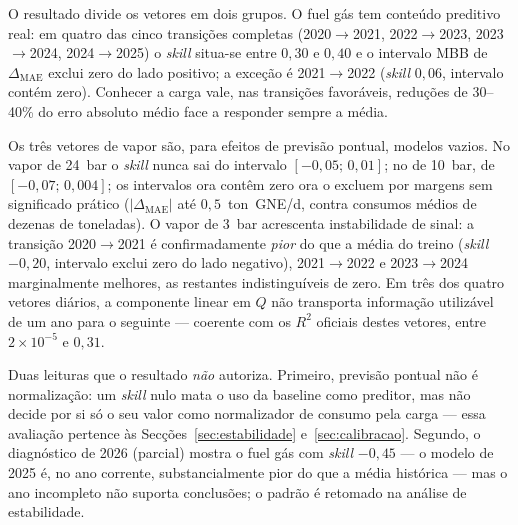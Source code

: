 O resultado divide os vetores em dois grupos. O fuel gás tem conteúdo
preditivo real: em quatro das cinco transições completas
(2020${\to}$2021, 2022${\to}$2023, 2023${\to}$2024, 2024${\to}$2025) o
\emph{skill} situa-se entre $0{,}30$ e $0{,}40$ e o intervalo MBB de
$\Delta_{\mathrm{MAE}}$ exclui zero do lado positivo; a exceção é
2021${\to}$2022 (\emph{skill} $0{,}06$, intervalo contém zero). Conhecer a
carga vale, nas transições favoráveis, reduções de 30--40\% do erro absoluto
médio face a responder sempre a média.

Os três vetores de vapor são, para efeitos de previsão pontual, modelos
vazios. No vapor de 24~bar o \emph{skill} nunca sai do intervalo
$[-0{,}05;\,0{,}01]$; no de 10~bar, de $[-0{,}07;\,0{,}004]$; os intervalos
ora contêm zero ora o excluem por margens sem significado prático
($|\Delta_{\mathrm{MAE}}|$ até $0{,}5$~ton~GNE/d, contra consumos médios de
dezenas de toneladas). O vapor de 3~bar acrescenta instabilidade de sinal: a
transição 2020${\to}$2021 é confirmadamente \emph{pior} do que a média do
treino (\emph{skill} $-0{,}20$, intervalo exclui zero do lado negativo),
2021${\to}$2022 e 2023${\to}$2024 marginalmente melhores, as restantes
indistinguíveis de zero. Em três dos quatro vetores diários, a componente
linear em $Q$ não transporta informação utilizável de um ano para o seguinte
--- coerente com os $R^2$ oficiais destes vetores, entre $2\times10^{-5}$ e
$0{,}31$.

Duas leituras que o resultado \emph{não} autoriza. Primeiro, previsão pontual
não é normalização: um \emph{skill} nulo mata o uso da baseline como preditor,
mas não decide por si só o seu valor como normalizador de consumo pela carga
--- essa avaliação pertence às Secções~\ref{sec:estabilidade}
e~\ref{sec:calibracao}. Segundo, o diagnóstico de 2026 (parcial) mostra o
fuel gás com \emph{skill} $-0{,}45$ --- o modelo de 2025 é, no ano corrente,
substancialmente pior do que a média histórica --- mas o ano incompleto não
suporta conclusões; o padrão é retomado na análise de estabilidade.

